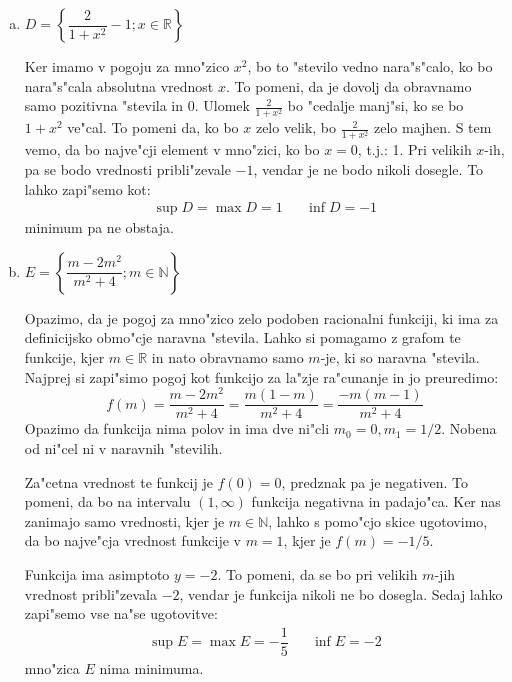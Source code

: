 \documentclass[12pt,a4paper,slovene]{article}
\newcommand{\NN}{\mathbb{N}}
\newcommand{\RR}{\mathbb{R}}
\begin{document}
\begin{enumerate}[(1)]
\begin{enumerate}[(a)]
		\item $D = \left\{\dfrac{2}{1+x^2} - 1; x \in \RR \right\}$
		
		Ker imamo v pogoju za mno"zico $x^2$, bo to "stevilo vedno nara"s"calo, ko bo nara"s"cala absolutna vrednost $x$. To pomeni, da je dovolj da obravnamo samo pozitivna "stevila in 0. Ulomek $\frac{2}{1+x^2}$ bo "cedalje manj"si, ko se bo $1+x^2$ ve"cal. To pomeni da, ko bo $x$ zelo velik, bo $\frac{2}{1+x^2}$ zelo majhen. S tem vemo, da bo najve"cji element v mno"zici, ko bo $x=0$, t.j.: 1. Pri velikih $x$-ih, pa se bodo vrednosti pribli"zevale $-1$, vendar je ne bodo nikoli dosegle. To lahko zapi"semo kot:
		\begin{align*}
		\sup D = \max D = 1 && \inf D = -1
		\end{align*}
		minimum pa ne obstaja.
		
		\item $E = \left\{\dfrac{m-2m^2}{m^2 + 4}; m \in \NN \right\}$
		
		Opazimo, da je pogoj za mno"zico zelo podoben racionalni funkciji, ki ima za definicijsko obmo"cje naravna "stevila. Lahko si pomagamo z grafom te funkcije, kjer $m \in \RR$ in nato obravnamo samo $m$-je, ki so naravna "stevila. Najprej si zapi"simo pogoj kot funkcijo za la"zje ra"cunanje in jo preuredimo:
		\begin{equation*}
		f(m) = \dfrac{m-2m^2}{m^2 + 4} = \dfrac{m(1-m)}{m^2 + 4} = \dfrac{-m(m-1)}{m^2 + 4}
		\end{equation*}
		Opazimo da funkcija nima polov in ima dve ni"cli $m_0 = 0, m_1 = 1/2$. Nobena od ni"cel ni v naravnih "stevilih.
		
		Za"cetna vrednost te funkcij je $f(0) = 0$, predznak pa je negativen. To pomeni, da bo na intervalu $(1, \infty)$ funkcija negativna in padajo"ca. Ker nas zanimajo samo vrednosti, kjer je $m \in \NN$, lahko s pomo"cjo skice ugotovimo, da bo najve"cja vrednost funkcije v $m = 1$, kjer je $f(m) = -1/5$.
		
		Funkcija ima asimptoto $y = -2$. To pomeni, da se bo pri velikih $m$-jih vrednost pribli"zevala $-2$, vendar je funkcija nikoli ne bo dosegla. Sedaj lahko zapi"semo vse na"se ugotovitve:
		\begin{align*}
		\sup E = \max E = -\dfrac{1}{5} && \inf E = -2
		\end{align*}
		mno"zica $E$ nima minimuma.
	\end{enumerate}
\end{enumerate}
\end{document}
